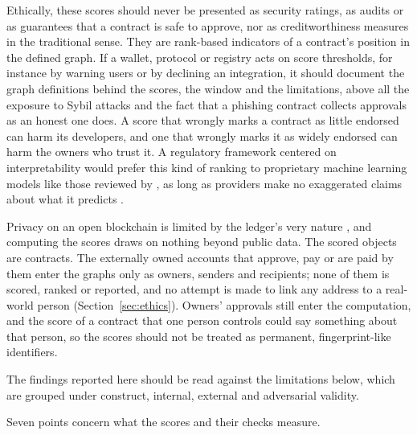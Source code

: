 Ethically, these scores should never be presented as security ratings, as audits or as guarantees that a contract is safe to approve, nor as creditworthiness measures in the traditional sense. They are rank-based indicators of a contract's position in the defined graph. If a wallet, protocol or registry acts on score thresholds, for instance by warning users or by declining an integration, it should document the graph definitions behind the scores, the window and the limitations, above all the exposure to Sybil attacks and the fact that a phishing contract collects approvals as an honest one does. A score that wrongly marks a contract as little endorsed can harm its developers, and one that wrongly marks it as widely endorsed can harm the owners who trust it. A regulatory framework centered on interpretability would prefer this kind of ranking to proprietary machine learning models like those reviewed by \textcite{kotb2023credit}, as long as providers make no exaggerated claims about what it predicts \parencite{packin2024credit}.

Privacy on an open blockchain is limited by the ledger's very nature \parencite{narayanan2016bitcoin}, and computing the scores draws on nothing beyond public data. The scored objects are contracts. The externally owned accounts that approve, pay or are paid by them enter the graphs only as owners, senders and recipients; none of them is scored, ranked or reported, and no attempt is made to link any address to a real-world person (Section~\ref{sec:ethics}). Owners' approvals still enter the computation, and the score of a contract that one person controls could say something about that person, so the scores should not be treated as permanent, fingerprint-like identifiers.


The findings reported here should be read against the limitations below, which are grouped under construct, internal, external and adversarial validity.


Seven points concern what the scores and their checks measure.

